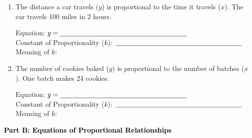 \documentclass[12pt, letterpaper, fleqn]{article}
\newcommand{\blanklong}{\underline{\hspace{6.5cm}}}
\begin{document}
\begin{enumerate}[itemsep=2.5cm, leftmargin=0.6cm]
\vspace{1.5cm}

\begin{tcolorbox}[colback=customteal!10, sharp corners]
Equation: $y = \blanklong$ \\
Constant of Proportionality ($k$): $\blanklong$ \\
Meaning of $k$: \blanklong
\end{tcolorbox}

\vspace{1.5cm}
\item The distance a car travels ($y$) is proportional to the time it travels ($x$). The car travels 100 miles in 2 hours.

\vspace{1.5cm}

\begin{tcolorbox}[colback=customteal!10, sharp corners]
Equation: $y = \blanklong$ \\
Constant of Proportionality ($k$): $\blanklong$ \\
Meaning of $k$: \blanklong
\end{tcolorbox}

\vspace{1.5cm}
\item The number of cookies baked ($y$) is proportional to the number of batches ($x$). One batch makes 24 cookies.

\vspace{1.5cm}

\begin{tcolorbox}[colback=customteal!10, sharp corners]
Equation: $y = \blanklong$ \\
Constant of Proportionality ($k$): $\blanklong$ \\
Meaning of $k$: \blanklong
\end{tcolorbox}
\end{enumerate}

\newpage

\begin{tcolorbox}[colback=customteal!20]
\large\textcolor{black}{\textbf{Part B: Equations of Proportional Relationships}}
\end{tcolorbox}

\vspace{3mm}
\end{document}
